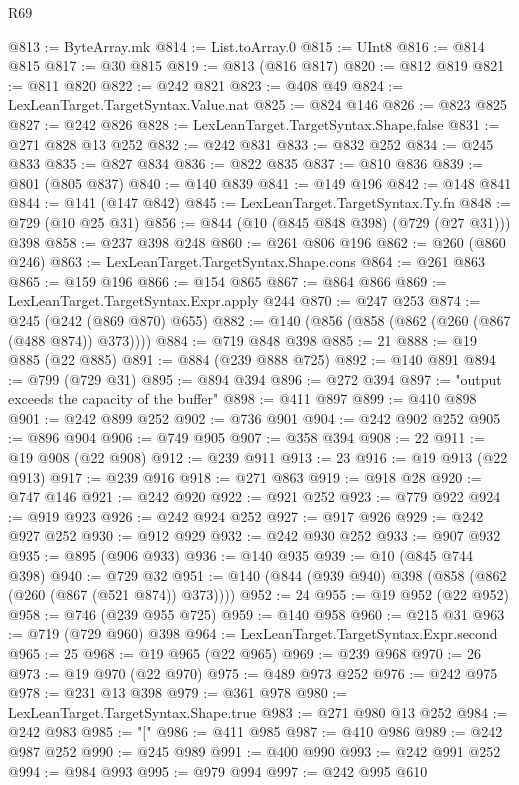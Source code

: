 \begin{lexlean}{R69}
\begin{coremodule}
@813 := ByteArray.mk
@814 := List.toArray.{0}
@815 := UInt8
@816 := @814 @815
@817 := @30 @815
@819 := @813 (@816 @817)
@820 := @812 @819
@821 := @811 @820
@822 := @242 @821
@823 := @408 @49
@824 := LexLeanTarget.TargetSyntax.Value.nat
@825 := @824 @146
@826 := @823 @825
@827 := @242 @826
@828 := LexLeanTarget.TargetSyntax.Shape.false
@831 := @271 @828 @13 @252
@832 := @242 @831
@833 := @832 @252
@834 := @245 @833
@835 := @827 @834
@836 := @822 @835
@837 := @810 @836
@839 := @801 (@805 @837)
@840 := @140 @839
@841 := @149 @196
@842 := @148 @841
@844 := @141 (@147 @842)
@845 := LexLeanTarget.TargetSyntax.Ty.fn
@848 := @729 (@10 @25 @31)
@856 := @844 (@10 (@845 @848 @398) (@729 (@27 @31))) @398
@858 := @237 @398 @248
@860 := @261 @806 @196
@862 := @260 (@860 @246)
@863 := LexLeanTarget.TargetSyntax.Shape.cons
@864 := @261 @863
@865 := @159 @196
@866 := @154 @865
@867 := @864 @866
@869 := LexLeanTarget.TargetSyntax.Expr.apply @244
@870 := @247 @253
@874 := @245 (@242 (@869 @870) @655)
@882 := @140 (@856 (@858 (@862 (@260 (@867 (@488 @874)) @373))))
@884 := @719 @848 @398
@885 := 21
@888 := @19 @885 (@22 @885)
@891 := @884 (@239 @888 @725)
@892 := @140 @891
@894 := @799 (@729 @31)
@895 := @894 @394
@896 := @272 @394
@897 := "output exceeds the capacity of the buffer"
@898 := @411 @897
@899 := @410 @898
@901 := @242 @899 @252
@902 := @736 @901
@904 := @242 @902 @252
@905 := @896 @904
@906 := @749 @905
@907 := @358 @394
@908 := 22
@911 := @19 @908 (@22 @908)
@912 := @239 @911
@913 := 23
@916 := @19 @913 (@22 @913)
@917 := @239 @916
@918 := @271 @863
@919 := @918 @28
@920 := @747 @146
@921 := @242 @920
@922 := @921 @252
@923 := @779 @922
@924 := @919 @923
@926 := @242 @924 @252
@927 := @917 @926
@929 := @242 @927 @252
@930 := @912 @929
@932 := @242 @930 @252
@933 := @907 @932
@935 := @895 (@906 @933)
@936 := @140 @935
@939 := @10 (@845 @744 @398)
@940 := @729 @32
@951 := @140 (@844 (@939 @940) @398 (@858 (@862 (@260 (@867 (@521 @874)) @373))))
@952 := 24
@955 := @19 @952 (@22 @952)
@958 := @746 (@239 @955 @725)
@959 := @140 @958
@960 := @215 @31
@963 := @719 (@729 @960) @398
@964 := LexLeanTarget.TargetSyntax.Expr.second
@965 := 25
@968 := @19 @965 (@22 @965)
@969 := @239 @968
@970 := 26
@973 := @19 @970 (@22 @970)
@975 := @489 @973 @252
@976 := @242 @975
@978 := @231 @13 @398
@979 := @361 @978
@980 := LexLeanTarget.TargetSyntax.Shape.true
@983 := @271 @980 @13 @252
@984 := @242 @983
@985 := "["
@986 := @411 @985
@987 := @410 @986
@989 := @242 @987 @252
@990 := @245 @989
@991 := @400 @990
@993 := @242 @991 @252
@994 := @984 @993
@995 := @979 @994
@997 := @242 @995 @610

\end{coremodule}
\end{lexlean}
